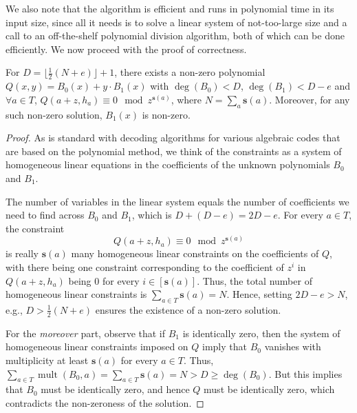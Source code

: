 \documentclass{theoretics}
\newcommand{\hpartial}{{\mathchar'26\mkern-10mu \partial}}
\newcommand{\mult}{\operatorname{mult}}
\newcommand{\sbar}{\mathbf{s}}
\begin{document}
	We also note that the algorithm is efficient and runs in polynomial time in its input size, since all it needs is to solve a linear system of not-too-large size and a call to an off-the-shelf polynomial division algorithm, both of which can be done efficiently. We now proceed with the proof of correctness. 
	
	
	\begin{claim}\label{clm: interpolation}
		For $D = \lfloor \frac{1}{2}(N+e) \rfloor + 1$, there exists a non-zero polynomial $Q(x,y) = B_0(x)+y\cdot B_1(x)$ with $\deg(B_0) < D$, $\deg(B_1) < D-e$ and $\forall a \in T$, $Q(a+z, h_a) \equiv 0 \mod z^{\sbar(a)}$, where $N = \sum_a \sbar(a)$. 
		Moreover, for any such non-zero solution, $B_1(x)$ is non-zero.
	\end{claim}
	
	\begin{proof}
		As is standard with decoding algorithms for various algebraic codes that are based on the polynomial method, we think of the constraints as a system of homogeneous linear equations in the coefficients of the unknown polynomials $B_0$ and $B_1$. 
		
		The number of variables in the linear system equals the number of
		coefficients we need to find across $B_0$ and $B_1$, which is
		$D+(D-e) = 2D-e$. For every $a \in T$, the constraint
		\[ Q(a+z, h_a) \equiv 0 \mod z^{\sbar(a)} \] is really $\sbar(a)$ many
		homogeneous linear constraints on the coefficients of $Q$, with there
		being one constraint corresponding to the coefficient of $z^i$ in
		$Q(a+z, h_a)$ being $0$ for every $i \in [\sbar(a)]$. Thus, the total
		number of homogeneous linear constraints is
		$\sum_{a\in T} \sbar(a) = N$. Hence, setting $2D-e >N$, e.g.,
		$D > \frac{1}{2}(N+e)$ ensures the existence of a non-zero solution.
		
		For the \emph{moreover} part, observe that if $B_1$ is identically
		zero, then the system of homogeneous linear constraints imposed on $Q$
		imply that $B_0$ vanishes with multiplicity at least $\sbar(a)$ for
		every $a \in T$. Thus,
		$\sum_{a \in T} \mult(B_0, a) = \sum_{a \in T} \sbar(a) = N > D \geq
		\deg(B_0)$. But this implies that $B_0$ must be identically zero, and
		hence $Q$ must be identically zero, which contradicts the non-zeroness
		of the solution.
	\end{proof}
	
\end{document}
